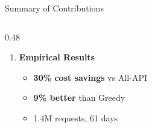 \documentclass[aspectratio=169,10pt]{beamer}
\begin{document}
\begin{frame}{Summary of Contributions}
\begin{columns}[T]
\begin{column}{0.48\textwidth}
\begin{enumerate}
    \vspace{0.2cm}
    \item \textbf{Empirical Results}
    \begin{itemize}
        \item \textbf{30\% cost savings} vs All-API
        \item \textbf{9\% better} than Greedy
        \item 1.4M requests, 61 days
    \end{itemize}
\end{enumerate}

\vspace{0.3cm}
\centering
{}
\end{column}
\end{columns}
\end{frame}
\end{document}
